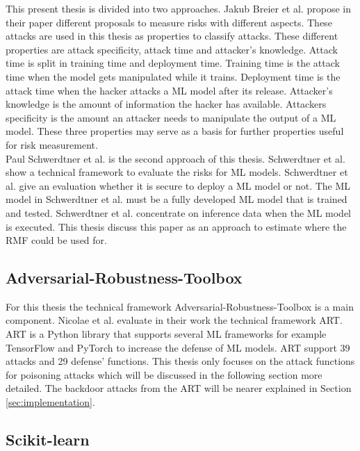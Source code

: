 This present thesis is divided into two approaches. Jakub Breier et al. \cite{DBLP:journals/corr/abs-2012-04884} propose in their paper different proposals to measure risks with different
aspects. These attacks are used in this thesis as properties to classify attacks. These different properties are attack specificity, attack time and attacker's knowledge. Attack time is
split in training time and deployment time. Training time is the attack time when the model gets manipulated while it trains. Deployment time is the attack time when the hacker attacks a
ML model after its release. Attacker's knowledge is the amount of information the hacker has available. Attackers specificity is the amount an attacker needs to manipulate the output of a
ML model. These three properties may serve as a basis for further properties useful for risk measurement. \\
Paul Schwerdtner et al. \cite{DBLP:journals/corr/abs-2011-04328} is the second approach of this thesis. Schwerdtner et al. show a technical framework to evaluate the risks for ML models.
Schwerdtner et al. give an evaluation whether it is secure to deploy a ML model or not. The ML model in Schwerdtner et al. must be a fully developed ML model that is trained and tested.
Schwerdtner et al. concentrate on inference data when the ML model is executed. This thesis discuss this paper as an approach to estimate where the RMF could be used for.

\subsection{Adversarial-Robustness-Toolbox}

For this thesis the technical framework Adversarial-Robustness-Toolbox \cite{art2018} is a main component. Nicolae et al. \cite{DBLP:journals/corr/abs-1807-01069} evaluate in their work
the technical framework ART. ART is a Python library that supports several ML frameworks for example TensorFlow and PyTorch to increase the defense of ML models. ART support 39 attacks
and 29 defense' functions. This thesis only focuses on the attack functions for poisoning attacks which will be discussed in the following section more detailed. The backdoor attacks from the ART will be nearer explained in Section \ref{sec:implementation}.

\subsection{Scikit-learn}

